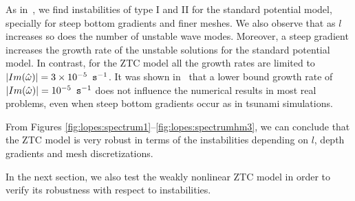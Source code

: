 As in~\citet{LovholtPedersen2009}, we find
instabilities of type I and II  for the standard
potential model, specially for steep bottom gradients and finer meshes.
We also observe that as $l$ increases so does the number of
unstable wave modes.  Moreover, a steep gradient increases the
growth rate of the unstable solutions for the standard
potential model.
In contrast, for the ZTC model  all the growth rates are
limited to $|Im(\hat\omega)|=3\times 10^{-5}\,~{\tt s}^{-1}$.
It was shown in~\citet{LovholtPedersen2009} that a
lower bound growth rate of $|Im(\hat\omega)|=10^{-5}\,~{\tt
s}^{-1}$ does not influence the numerical results in most
real problems, even when steep bottom gradients occur as in
tsunami simulations.

From Figures \ref{fig:lopes:spectrum1}--\ref{fig:lopes:spectrumhm3},
 we can conclude that the ZTC model is very robust in terms
 of the instabilities depending on $l$, depth gradients and
 mesh discretizations.

In the next section, we  also test the weakly nonlinear ZTC
model in order to verify its robustness with respect to instabilities.

